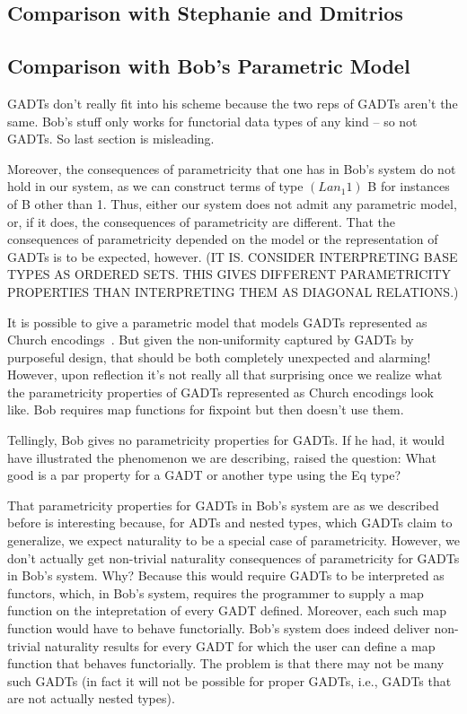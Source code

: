 \documentclass[acmsmall,screen,review,anonymous]{acmart}
\theoremstyle{definition}
\begin{document}
\pagebreak


\subsection{Comparison with Stephanie and Dmitrios}


\subsection{Comparison with Bob's Parametric Model}

GADTs don't really fit into his scheme because the two reps of GADTs
aren't the same. Bob's stuff only works for functorial data types of
any kind -- so not GADTs. So last section is misleading.





Moreover, the consequences of parametricity that one has in Bob's
system do not hold in our system, as we can construct terms of type
$(Lan_1 1)$ B for instances of B other than 1.  Thus, either our
system does not admit any parametric model, or, if it does, the
consequences of parametricity are different.  That the consequences of
parametricity depended on the model or the representation of GADTs is
to be expected, however. (IT IS. CONSIDER INTERPRETING BASE TYPES AS
ORDERED SETS. THIS GIVES DIFFERENT PARAMETRICITY PROPERTIES THAN
INTERPRETING THEM AS DIAGONAL RELATIONS.)

It is possible to give a parametric model that models GADTs
represented as Church encodings~\cite{atk12}.  But given the
non-uniformity captured by GADTs by purposeful design, that should be
both completely unexpected and alarming! However, upon reflection it's
not really all that surprising once we realize what the parametricity
properties of GADTs represented as Church encodings look like. Bob
requires map functions for fixpoint but then doesn't use them.

Tellingly, Bob gives no parametricity properties for GADTs. If he had,
it would have illustrated the phenomenon we are describing, raised the
question: What good is a par property for a GADT or another type using
the Eq type?

That parametricity properties for GADTs in Bob's system are as we
described before is interesting because, for ADTs and nested types,
which GADTs claim to generalize, we expect naturality to be a special
case of parametricity. However, we don't actually get non-trivial
naturality consequences of parametricity for GADTs in Bob's
system. Why? Because this would require GADTs to be interpreted as
functors, which, in Bob's system, requires the programmer to supply a
map function on the intepretation of every GADT defined. Moreover,
each such map function would have to behave functorially. Bob's system
does indeed deliver non-trivial naturality results for every GADT for
which the user can define a map function that behaves
functorially. The problem is that there may not be many such GADTs (in
fact it will not be possible for proper GADTs, i.e., GADTs that are
not actually nested types).
\end{document}
